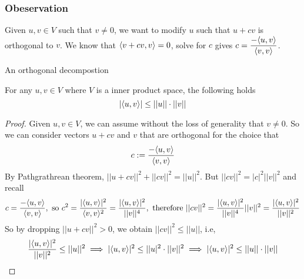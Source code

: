\subsubsection*{Obeservation}
Given $u,v \in V$ such that $v \neq 0$, we want to modify $u$ such that $u + cv$ is orthogonal to $v$. We know that $\langle v + cv, v \rangle = 0$, solve for $c$ gives $c = \displaystyle\frac{-\langle u, v\rangle}{\langle v, v \rangle}$.
\begin{center}

    An orthogonal decompostion
\end{center}
\begin{theorem}
    For any $u,v \in V$ where $V$ is a inner product space, the following holds
    \[ |\langle u,v \rangle| \leq ||u|| \cdot ||v||\]
\end{theorem}
\begin{proof}
    Given $u,v \in V$, we can assume without the loss of generality that $v \neq 0$. So we can consider vectors $u + cv$ and $v$ that are orthogonal for the choice that 
    \[ c: = \frac{ - \langle u,v \rangle}{\langle v,v\rangle}\]
    By Pathgrathrean theorem, $||u + cv||^2 + ||cv||^2 = ||u||^2$. But $||cv||^2 = |c|^2||v||^2$ and recall \[ c= \frac{- \langle u,v\rangle}{\langle v,v\rangle}, \text{ so } c^2= \frac{|\langle u,v\rangle|^2}{\langle v,v\rangle^2} = \frac{|\langle u, v \rangle|^2}{||v||^4}, \text{ therefore } ||cv||^2 = \frac{|\langle u, v \rangle|^2}{||v||^4} ||v||^2 = \frac{|\langle u, v \rangle|^2}{||v||^2}\]
    So by dropping $|| u + cv||^2 > 0$, we obtain $||cv||^2 \leq ||u||$, i.e, 
    \[ \frac{|\langle u, v \rangle|^2}{||v||^2} \leq ||u||^2 \implies |\langle u,v\rangle|^2 \leq ||u|^2 \cdot ||v||^2 \implies |\langle u,v \rangle|^2 \leq ||u|| \cdot ||v||\]
\end{proof}


